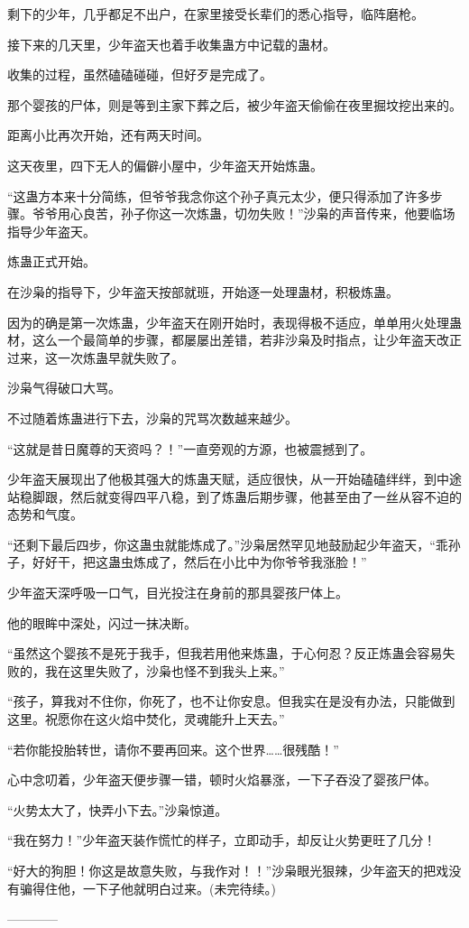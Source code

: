 \begin{this_body}
剩下的少年，几乎都足不出户，在家里接受长辈们的悉心指导，临阵磨枪。

接下来的几天里，少年盗天也着手收集蛊方中记载的蛊材。

收集的过程，虽然磕磕碰碰，但好歹是完成了。

那个婴孩的尸体，则是等到主家下葬之后，被少年盗天偷偷在夜里掘坟挖出来的。

距离小比再次开始，还有两天时间。

这天夜里，四下无人的偏僻小屋中，少年盗天开始炼蛊。

“这蛊方本来十分简练，但爷爷我念你这个孙子真元太少，便只得添加了许多步骤。爷爷用心良苦，孙子你这一次炼蛊，切勿失败！”沙枭的声音传来，他要临场指导少年盗天。

炼蛊正式开始。

在沙枭的指导下，少年盗天按部就班，开始逐一处理蛊材，积极炼蛊。

因为的确是第一次炼蛊，少年盗天在刚开始时，表现得极不适应，单单用火处理蛊材，这么一个最简单的步骤，都屡屡出差错，若非沙枭及时指点，让少年盗天改正过来，这一次炼蛊早就失败了。

沙枭气得破口大骂。

不过随着炼蛊进行下去，沙枭的咒骂次数越来越少。

“这就是昔日魔尊的天资吗？！”一直旁观的方源，也被震撼到了。

少年盗天展现出了他极其强大的炼蛊天赋，适应很快，从一开始磕磕绊绊，到中途站稳脚跟，然后就变得四平八稳，到了炼蛊后期步骤，他甚至由了一丝从容不迫的态势和气度。

“还剩下最后四步，你这蛊虫就能炼成了。”沙枭居然罕见地鼓励起少年盗天，“乖孙子，好好干，把这蛊虫炼成了，然后在小比中为你爷爷我涨脸！”

少年盗天深呼吸一口气，目光投注在身前的那具婴孩尸体上。

他的眼眸中深处，闪过一抹决断。

“虽然这个婴孩不是死于我手，但我若用他来炼蛊，于心何忍？反正炼蛊会容易失败的，我在这里失败了，沙枭也怪不到我头上来。”

“孩子，算我对不住你，你死了，也不让你安息。但我实在是没有办法，只能做到这里。祝愿你在这火焰中焚化，灵魂能升上天去。”

“若你能投胎转世，请你不要再回来。这个世界……很残酷！”

心中念叨着，少年盗天便步骤一错，顿时火焰暴涨，一下子吞没了婴孩尸体。

“火势太大了，快弄小下去。”沙枭惊道。

“我在努力！”少年盗天装作慌忙的样子，立即动手，却反让火势更旺了几分！

“好大的狗胆！你这是故意失败，与我作对！！”沙枭眼光狠辣，少年盗天的把戏没有骗得住他，一下子他就明白过来。(未完待续。)

------------

\end{this_body}

